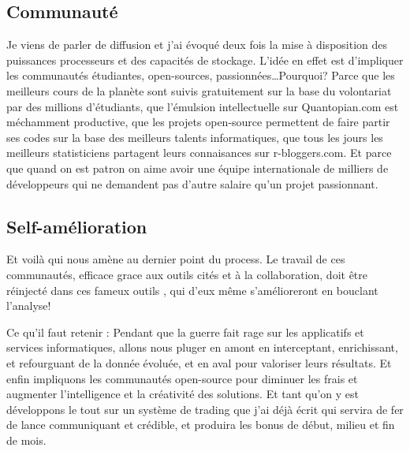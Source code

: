 \subsection{Communauté}
        Je viens de parler de diffusion et j'ai évoqué deux fois la mise à
disposition des puissances processeurs et des capacités de stockage. L'idée en
effet est d'impliquer les communautés étudiantes, open-sources,
passionnées\ldots Pourquoi? Parce que les meilleurs cours de la planète
sont suivis gratuitement sur la base du volontariat par des millions
d'étudiants, que l'émulsion intellectuelle sur Quantopian.com est méchamment
productive, que les projets open-source permettent de faire partir ses codes
sur la base des meilleurs talents informatiques, que tous les jours les
meilleurs statisticiens partagent leurs connaisances sur r-bloggers.com. Et
parce que quand on est patron on aime avoir une équipe internationale de
milliers de développeurs qui ne demandent pas d'autre salaire qu'un projet
passionnant.


\subsection{Self-amélioration}
        Et voilà qui nous amène au dernier point du process. Le travail de
ces communautés, efficace grace aux outils cités et à la
collaboration, doit être réinjecté dans ces fameux outils , qui d'eux même s'amélioreront en
bouclant l'analyse!\newline
\newline


Ce qu'il faut retenir : Pendant que la guerre fait rage sur les applicatifs
et services informatiques, allons nous pluger en amont en interceptant,
enrichissant, et refourguant de la donnée évoluée, et en aval pour
valoriser leurs résultats. Et enfin impliquons les communautés open-source
pour diminuer les frais et augmenter l'intelligence et la créativité des
solutions.\newline
Et tant qu'on y est développons le tout sur un système de trading que j'ai
déjà écrit qui servira de fer de lance communiquant et crédible, et
produira les bonus de début, milieu et fin de mois.
\newpage




